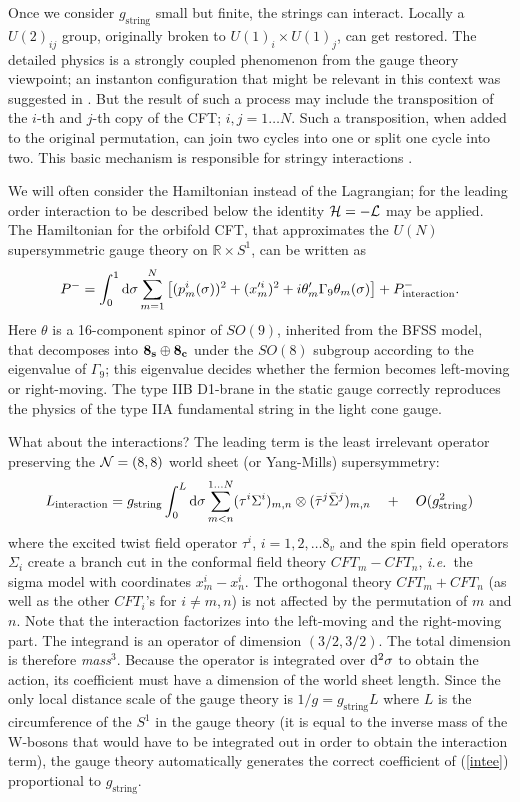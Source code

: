 \documentclass[nohyper,12pt,letterpaper]{JHEP3}
\def\IR{{\mathbb R}}
\def \eqn#1#2{\begin{equation}#2\label{#1}\end{equation}}
\def \gs{g_{\mathrm{string}}}
\def \inte{{\mathrm{interaction}}}
\begin{document}
Once we consider $\gs$ small but finite, the strings can
interact. Locally a $U(2)_{ij}$ group, originally broken to $U(1)_i
\times U(1)_j$, can get restored.
The detailed physics is a strongly
coupled phenomenon from the gauge theory viewpoint; an instanton 
configuration that might be relevant in this context was suggested
in \cite{nestione,nestitwo}.
But the result of
such a process may include the transposition of the $i$-th and $j$-th
copy of the CFT; $i,j=1\dots N$.  Such a transposition, when added to
the original permutation, can join two cycles into one or split one
cycle into two. This basic mechanism is responsible for stringy
interactions \cite{lumodvv}.

We will often consider the Hamiltonian instead of the Lagrangian; for
the leading order interaction to be described below the identity
${\cal H} = -{\cal L}$ may be applied.  The Hamiltonian for the
orbifold CFT, that approximates the $U(N)$ supersymmetric gauge theory
on $\IR\times S^1$, can be written as
\eqn{hamidvvorig}{P^- = \int_0^1 {\rm d}\sigma
\sum_{m=1}^N
\left[(p_m^i(\sigma))^2
+(x^{\prime i}_m)^2+i\theta'_m\Gamma_9\theta_m(\sigma)
\right]
+P^-_\inte.}  
Here $\theta$ is a 16-component spinor of $SO(9)$,
inherited from the BFSS model, that decomposes into ${\bf 8_s}\oplus
{\bf 8_c}$ under the $SO(8)$ subgroup according to the eigenvalue of
$\Gamma_9$; this eigenvalue decides whether the fermion becomes
left-moving or right-moving. The type IIB D1-brane in the static gauge
correctly reproduces the physics of the type IIA fundamental string in
the light cone gauge.

What about the interactions? The leading term is the least irrelevant operator
preserving the ${\cal N}=(8,8)$ world sheet (or Yang-Mills) supersymmetry:
%
\eqn{inteeorig}{
{L}_\inte
= \gs
\int_0^L {\rm d}\sigma
\sum_{m<n}^{1\dots N}
(\tau^i\Sigma^i)_{m,n}\otimes (\bar \tau^j\bar\Sigma^j)_{m,n}
\quad + \quad
O(\gs^2)} 
%
where the excited twist field operator $\tau^i$, $i=1, 2,
\dots 8_v$ and the spin field operators $\Sigma_i$ create a branch cut
in the conformal field theory $CFT_m-CFT_n$, {\it i.e.}\ the sigma
model with coordinates $x_m^i - x_n^i$.  The orthogonal theory
$CFT_m+CFT_n$ (as well as the other $CFT_i$'s for $i\neq m,n$) is not
affected by the permutation of $m$ and $n$. Note that the interaction
factorizes into the left-moving and the right-moving part. The
integrand is an operator of dimension $(3/2,3/2)$. The total dimension
is therefore {\it mass}${}^3$. Because the operator is integrated over
${\rm d}^2\sigma$ to obtain the action, its coefficient must have a
dimension of the world sheet length. Since the only local distance
scale of the gauge theory is $1/g = \gs L$ where $L$ is the
circumference of the $S^1$ in the gauge theory (it is equal to the
inverse mass of the W-bosons that would have to be integrated out in
order to obtain the interaction term), the gauge theory automatically
generates the correct coefficient of (\ref{intee}) proportional to
$\gs$.
\end{document}
